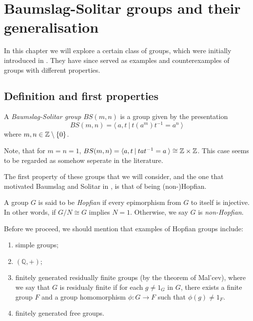 \pagebreak %

\section{Baumslag-Solitar groups and their generalisation}

In this chapter we will explore a certain class of groups, which were initially introduced in \cite{BaSo62}. They have since served as examples and counterexamples of groups with different properties.

\subsection{Definition and first properties}

\begin{definition}
    A \emph{Baumslag-Solitar group $BS(m,n)$} is a group given by the presentation \[BS(m,n) = \langle \: a, t\:|\:t(a^m)t^{-1} = a^n \: \rangle \] where $m,n \in \mathbb{Z} \setminus \{0\}$.
\end{definition}

\begin{remark}
    Note, that for $m = n = 1$, $BS(m,n) = \langle a,t \: | \: tat^{-1} = a \: \rangle \cong \mathbb{Z} \times \mathbb{Z}$. This case seems to be regarded as somehow seperate in the literature.
\end{remark}

The first property of these groups that we will consider, and the one that motivated Baumslag and Solitar in \cite{BaSo62}, is that of being (non-)Hopfian.

\begin{definition}
    A group $G$ is said to be \emph{Hopfian} if every epimorphism from $G$ to itself is injective. In other words, if $G/N \cong G$ implies $N = 1$. Otherwise, we say $G$ is \emph{non-Hopfian}.
\end{definition}
    
Before we proceed, we should mention that examples of Hopfian groups include:
\begin{enumerate}
    \item simple groups;
    \item $(\mathbb{Q},+)$;
    \item finitely generated residually finite groups (by the theorem of Mal'cev), where we say that $G$ is residualy finite if for each $g \neq 1_G$ in $G$, there exists a finite group $F$ and a group homomorphism $\phi: G \to F$ such that $\phi(g) \neq 1_F$.
    \item finitely generated free groups.
\end{enumerate}

